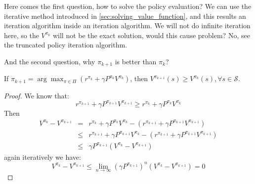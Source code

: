 \documentclass[10pt]{elegantbook}
\begin{document}
Here comes the first question, how to solve the policy evaluation? We can use the iterative method introduced in \ref{sec:solving_value_function}, and this 
results an iteration algorithm inside an iteration algorithm. We will not do infinite iteration here, so the $V^{\pi_k}$ will not be the exact solution, would 
this cause problem? No, see the truncated policy iteration algorithm.

And the second question, why $\pi_{k+1}$ is better than $\pi_{k}$?
\begin{lemma} \label{lemma:policy_improvement}
    If $\pi_{k+1} = \arg\max_{\pi \in \Pi} (r^{\pi_k} + \gamma P^{\pi_k}V^{\pi_k})$, then $V^{\pi_{k+1}}(s) \geq V^{\pi_{k}}(s), \forall s \in \mathcal S$.
\end{lemma}
\begin{proof}
    We know that:
    \[ r^{\pi_{k+1}} + \gamma P^{\pi_{k+1}}V^{\pi_{k+1}} \geq r^{\pi_k} + \gamma P^{\pi_k}V^{\pi_k} \]
    Then
    \[
    \begin{array}{lll}
        V^{\pi_k} - V^{\pi_{k+1}} &=& r^{\pi_k} + \gamma P^{\pi_k}V^{\pi_k} - (r^{\pi_{k+1}} + \gamma P^{\pi_{k+1}}V^{\pi_{k+1}}) \\
        & \leq & r^{\pi_{k+1}} + \gamma P^{\pi_{k+1}}V^{\pi_k} - (r^{\pi_{k+1}} + \gamma P^{\pi_{k+1}}V^{\pi_{k+1}}) \\
        & \leq & \gamma P^{\pi_{k+1}}(V^{\pi_k} - V^{\pi_{k+1}})
    \end{array}
    \]
    again iteratively we have:
    \[ V^{\pi_k} - V^{\pi_{k+1}} \leq \lim_{n \rightarrow \infty} (\gamma P^{\pi_{k+1}})^n (V^{\pi_k} - V^{\pi_{k+1}}) = 0 \]
\end{proof}
\end{document}
